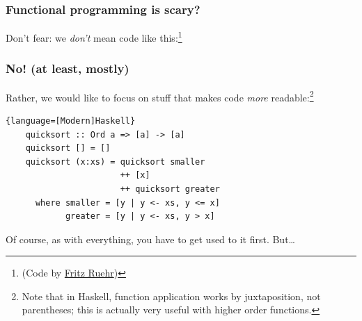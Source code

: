 \documentclass{beamer}
\begin{document}
\begin{frame}[containsverbatim]
  \frametitle{Functional programming is scary?}
  Don't fear: we \textit{don't} mean code like this:\footnote{(Code by
    \href{http://www.willamette.edu/~fruehr/haskell/evolution.html}{Fritz Ruehr})}

\end{frame}

\begin{frame}[containsverbatim]
  \frametitle{No! (at least, mostly)} 

  Rather, we would like to focus on stuff that makes code \textit{more} readable:\footnote{%
    Note that in Haskell, function application works by juxtaposition, not parentheses; this is
    actually very useful with higher order functions.}

  \begin{lstlisting}{language=[Modern]Haskell}
    quicksort :: Ord a => [a] -> [a]
    quicksort [] = []
    quicksort (x:xs) = quicksort smaller 
                       ++ [x] 
                       ++ quicksort greater
      where smaller = [y | y <- xs, y <= x]
            greater = [y | y <- xs, y > x]
  \end{lstlisting}

  Of course, as with everything, you have to get used to it first. But\ldots
\end{frame}
\end{document}
